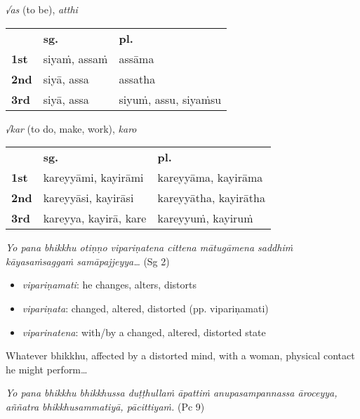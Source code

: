 \documentclass[11pt,oneside]{memoir}
\begin{document}
{\centering\par
\begin{multicols}{2}

\emph{√as} (to be), \emph{atthi}

\begin{center}
\begin{tabular}{lll}
 & \textbf{sg.} & \textbf{pl.}\\[0pt]
\textbf{1st} & siyaṁ, assaṁ & assāma\\[0pt]
\textbf{2nd} & siyā, assa & assatha\\[0pt]
\textbf{3rd} & siyā, assa & siyuṁ, assu, siyaṁsu\\[0pt]
\end{tabular}
\end{center}

\columnbreak

\emph{√kar} (to do, make, work), \emph{karo}

\begin{center}
\begin{tabular}{lll}
 & \textbf{sg.} & \textbf{pl.}\\[0pt]
\textbf{1st} & kareyyāmi, kayirāmi & kareyyāma, kayirāma\\[0pt]
\textbf{2nd} & kareyyāsi, kayirāsi & kareyyātha, kayirātha\\[0pt]
\textbf{3rd} & kareyya, kayirā, kare & kareyyuṁ, kayiruṁ\\[0pt]
\end{tabular}
\end{center}

\end{multicols}
\par}

\emph{Yo pana bhikkhu otiṇṇo vipariṇatena cittena mātugāmena saddhiṁ kāyasaṁsaggaṁ samāpajjeyya\ldots{}} (Sg 2)

\begin{itemize}
\item \emph{vipariṇamati}: he changes, alters, distorts
\item \emph{vipariṇata}: changed, altered, distorted (pp. vipariṇamati)
\item \emph{viparinatena}: with/by a changed, altered, distorted state
\end{itemize}

Whatever bhikkhu, affected by a distorted mind, with a woman, physical contact he might perform\ldots{}

\emph{Yo pana bhikkhu bhikkhussa duṭṭhullaṁ āpattiṁ anupasampannassa āroceyya, aññatra bhikkhusammatiyā, pācittiyaṁ.} (Pc 9)
\end{document}
